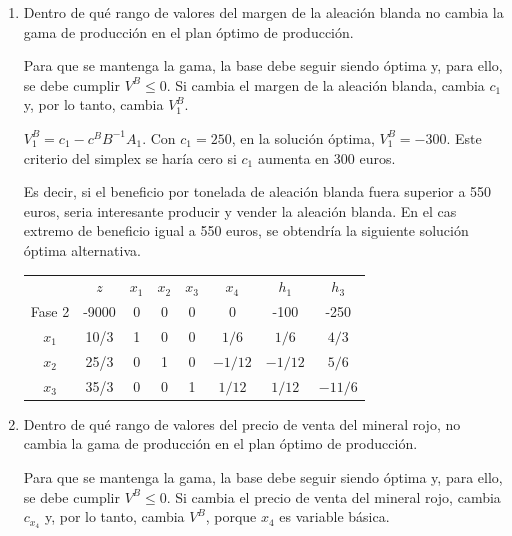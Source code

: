 \begin{enumerate}
\item Dentro de qué rango de valores del margen de la aleación blanda no cambia la gama de producción en el plan óptimo de producción.

Para que se mantenga la gama, la base debe seguir siendo óptima y, para ello, se debe cumplir $V^B \leq 0$. Si cambia el margen de la aleación blanda, cambia $c_1$ y, por lo tanto, cambia $V^B_1$.

$V^B_1=c_1-c^BB^{-1}A_1$. Con $c_1=250$, en la solución óptima, $V^B_1=-300$. Este criterio del simplex se haría cero si $c_1$ aumenta en 300 euros.

Es decir, si el beneficio por tonelada de aleación blanda fuera superior a 550 euros, seria interesante producir y vender la aleación blanda. En el cas extremo de beneficio igual a 550 euros, se obtendría la siguiente solución óptima alternativa.

\begin{center}
\begin{tabular}{c|c|cccccc|}
 & $z$ & $x_1$ & $x_2$ & $x_3$ & $x_4$ & $h_1$ & $h_3$\\ 
Fase 2 & -9000 & 0 & 0 & 0 & 0 & -100 & -250 \\ 
\hline
$x_1$ & 10/3  & 1 & 0 & 0 & $1/6$ & $1/6$ & $4/3$\\ 
$x_2$ & 25/3  & 0 & 1 & 0 & $-1/12$ & $-1/12$ & $5/6$\\ 
$x_3$ & 35/3  & 0 & 0 & 1 & $1/12$ & $1/12$ & $-11/6$\\ 
\hline
\end{tabular}
\end{center}


\item Dentro de qué rango de valores del precio de venta del mineral rojo, no cambia la gama de producción en el plan óptimo de producción.

Para que se mantenga la gama, la base debe seguir siendo óptima y, para ello, se debe cumplir $V^B \leq 0$. Si cambia el precio de venta del mineral rojo, cambia $c_{x_4}$ y, por lo tanto, cambia $V^B$, porque $x_4$ es variable básica.



\end{enumerate}

